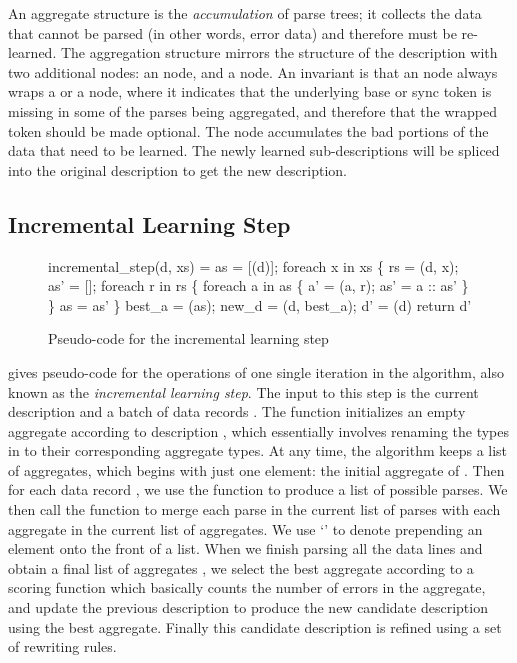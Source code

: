An aggregate structure is the {\em accumulation} of parse trees; it
collects the data that cannot be parsed (in other words, error data)
and therefore must be re-learned.
The aggregation structure mirrors the structure of the description  
with two additional nodes: an  node, and a  node. 
An invariant is that an  node always wraps a  or a  node,
where it indicates that the underlying base or sync token is missing
in some of the parses being aggregated, and therefore that the wrapped
token should be made optional. 
The  node accumulates the bad portions of the data that need
to be learned. The newly learned sub-descriptions 
will be spliced into the original description to get the new description. 

\subsection{Incremental Learning Step}
\begin{figure}[t]
\begin{codebox}
incremental_step(d, xs) =
  as = [(d)];
  foreach x in xs \{
    rs = (d, x);
    as' = [];
    foreach r in rs \{
      foreach a in as \{
        a' = (a, r); 
        as' = a :: as'
      \}
    \}
    as = as'
  \} 
  best_a = (as);
  new_d = (d, best_a);  
  d' = (d)
  return d'
\end{codebox}
\caption{Pseudo-code for the incremental learning step}
\label{fig:inc-learning}
\end{figure}

 gives pseudo-code for the operations of one
single iteration in the algorithm, also known as the {\em incremental
learning step}.
The input to this step is the current description  and a batch of
data records .
The  function initializes an empty aggregate
according to description , which essentially involves renaming
the types in  to their corresponding aggregate types.
At any time, the algorithm keeps a list of aggregates,
which begins with just one element: the initial aggregate of .
Then for each data record , we use the  function to
produce a list  of possible parses.
We then call the  function to merge
each parse  in the current list of parses with 
each aggregate  in the
current list of aggregates. 
We use `\cd{::}' to denote 
prepending an element onto the front of a list. 
When we finish parsing all the data lines and obtain 
a final list of aggregates , 
we select the best aggregate according to a scoring function which
basically counts the number of errors in the aggregate, 
and update the previous description
 to produce the new candidate description  
using the best aggregate. Finally this candidate description is
refined using a set of rewriting rules. 


